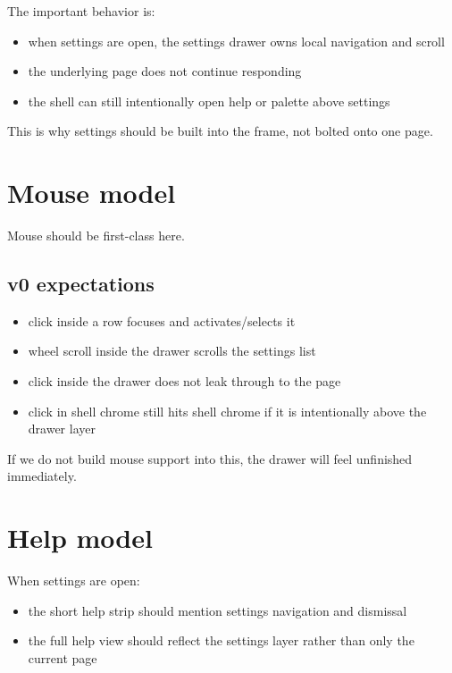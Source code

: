 The important behavior is:

\begin{itemize}
\tightlist
\item
  when settings are open, the settings drawer owns local navigation and scroll
\item
  the underlying page does not continue responding
\item
  the shell can still intentionally open help or palette above settings
\end{itemize}

This is why settings should be built into the frame, not bolted onto one page.

\section{Mouse model}\label{record-057-mouse-model}

Mouse should be first-class here.

\subsection{v0 expectations}\label{record-057-v0-expectations}

\begin{itemize}
\tightlist
\item
  click inside a row focuses and activates/selects it
\item
  wheel scroll inside the drawer scrolls the settings list
\item
  click inside the drawer does not leak through to the page
\item
  click in shell chrome still hits shell chrome if it is intentionally above the drawer layer
\end{itemize}

If we do not build mouse support into this, the drawer will feel unfinished immediately.

\section{Help model}\label{record-057-help-model}

When settings are open:

\begin{itemize}
\tightlist
\item
  the short help strip should mention settings navigation and dismissal
\item
  the full help view should reflect the settings layer rather than only the current page
\end{itemize}

